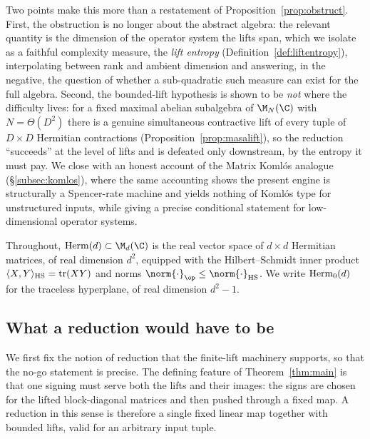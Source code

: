 Two points make this more than a restatement of Proposition~\ref{prop:obstruct}.
First, the obstruction is no longer about the abstract algebra: the relevant
quantity is the dimension of the operator system the lifts span, which we isolate
as a faithful complexity measure, the \emph{lift entropy}
(Definition~\ref{def:liftentropy}), interpolating between rank and ambient
dimension and answering, in the negative, the question of whether a sub-quadratic
such measure can exist for the full algebra. Second, the bounded-lift hypothesis
is shown to be \emph{not} where the difficulty lives: for a fixed maximal abelian
subalgebra of $\M_N(\C)$ with $N=\Theta(D^2)$ there is a genuine simultaneous
contractive lift of every tuple of $D\times D$ Hermitian contractions
(Proposition~\ref{prop:masalift}), so the reduction ``succeeds'' at the level of
lifts and is defeated only downstream, by the entropy it must pay. We close with
an honest account of the Matrix Koml\'os analogue (\S\ref{subsec:komlos}), where
the same accounting shows the present engine is structurally a Spencer-rate
machine and yields nothing of Koml\'os type for unstructured inputs, while giving
a precise conditional statement for low-dimensional operator systems.

Throughout, $\Herm(d)\subset\M_d(\C)$ is the real vector space of $d\times d$
Hermitian matrices, of real dimension $d^2$, equipped with the
Hilbert--Schmidt inner product $\langle X,Y\rangle_{\mathrm{HS}}=\operatorname{tr}(XY)$
and norms $\norm{\cdot}_{\op}\le\norm{\cdot}_{\HS}$. We write $\mathrm{Herm}_0(d)$ for the
traceless hyperplane, of real dimension $d^2-1$.

\subsection{What a reduction would have to be}
\label{subsec:redef}

We first fix the notion of reduction that the finite-lift machinery supports, so
that the no-go statement is precise. The defining feature of Theorem~\ref{thm:main}
is that one signing must serve both the lifts and their images: the signs are
chosen for the lifted block-diagonal matrices and then pushed through a fixed map.
A reduction in this sense is therefore a single fixed linear map together with
bounded lifts, valid for an arbitrary input tuple.

